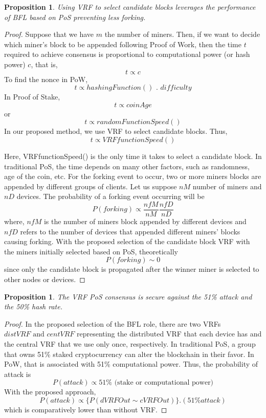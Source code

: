 \documentclass[5p,times]{elsarticle}
\newtheorem{prop}[thm]{Proposition}
\theoremstyle{definition}
\theoremstyle{remark}
\numberwithin{equation}{section}
\begin{document}
\begin{prop}
Using VRF to select candidate blocks leverages the performance of BFL based on PoS preventing less forking.
\end{prop}
\begin{proof}
Suppose that we have $m$ the number of miners. 
Then, if we want to decide which miner's block to be appended following Proof of Work, then the time $t$ required to achieve consensus is proportional to computational power (or hash power) $c$, that is,
$$t \propto c$$
To find the nonce in PoW, 
$$ t \propto hashingFunction() \text{ . } difficulty$$
In Proof of Stake, 
$$t \propto coinAge$$ or $$t \propto randomFunctionSpeed()$$
In our proposed method, we use VRF to select candidate blocks. 
Thus, 
$$t \propto VRFfunctionSpeed()$$

Here, VRFfunctionSpeed() is the only time it takes to select a candidate block.
In traditional PoS, the time depends on many other factors, such as randomness, age of the coin, etc. For the forking event to occur, two or more miners blocks are appended by different groups of clients.
Let us suppose $nM$ number of miners and $nD$ devices.
The probability of a forking event occurring will be $$ P(forking) \propto \frac{nfM}{nM} \frac{nfD}{nD}$$ where, 
$nfM$ is the number of miners block appended by different devices and
$nfD$ refers to the number of devices that appended different miners' blocks causing forking.
With the proposed selection of the candidate block VRF with the miners initially selected based on PoS, theoretically
$$P(forking) \sim 0$$ since only the candidate block is propagated after the winner miner is selected to other nodes or devices.
\end{proof}


\begin{prop}
The VRF PoS consensus is secure against the 51\% attack and the 50\% hash rate.
\end{prop}
\begin{proof}
In the proposed selection of the BFL role, there are two VRFs $distVRF \text{ and } centVRF$ representing the
distributed VRF that each device has and the central VRF that we use only once, respectively.
In traditional PoS, a group that owns 51\% staked cryptocurrency can alter the blockchain in their favor.
In PoW, that is associated with 51\% computational power.
Thus, the probability of attack is $$ P (attack) \propto 51\% \text{ (stake or computational power)}$$
With the proposed approach, 
$$P(attack) \propto \{ P(dVRFOut \sim cVRFOut) \} . (51\% attack)$$ which 
is comparatively lower than without VRF.
\end{proof}
\end{document}
